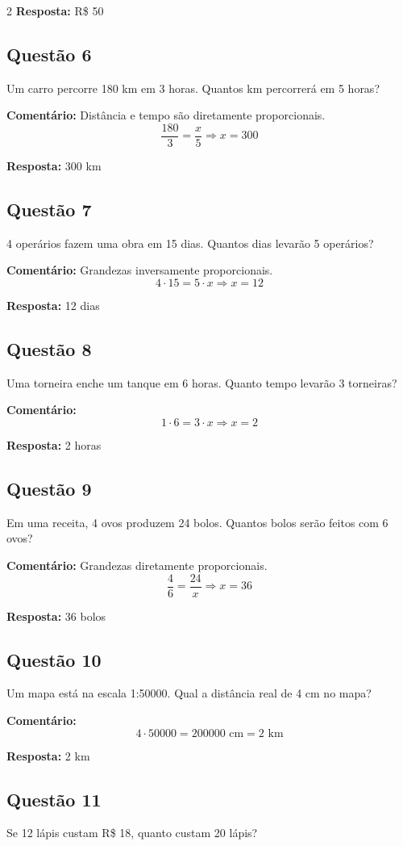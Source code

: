 \documentclass[11pt]{article}
\begin{document}
\begin{multicols}{2}
\textbf{Resposta:} R\$ 50

\subsection*{Questão 6}
Um carro percorre 180 km em 3 horas. Quantos km percorrerá em 5 horas?

\textbf{Comentário:} Distância e tempo são diretamente proporcionais.
\[
\frac{180}{3} = \frac{x}{5} \Rightarrow x = 300
\]

\textbf{Resposta:} 300 km

\subsection*{Questão 7}
4 operários fazem uma obra em 15 dias. Quantos dias levarão 5 operários?

\textbf{Comentário:} Grandezas inversamente proporcionais.
\[
4 \cdot 15 = 5 \cdot x \Rightarrow x = 12
\]

\textbf{Resposta:} 12 dias

\subsection*{Questão 8}
Uma torneira enche um tanque em 6 horas. Quanto tempo levarão 3 torneiras?

\textbf{Comentário:}
\[
1 \cdot 6 = 3 \cdot x \Rightarrow x = 2
\]

\textbf{Resposta:} 2 horas

\subsection*{Questão 9}
Em uma receita, 4 ovos produzem 24 bolos. Quantos bolos serão feitos com 6 ovos?

\textbf{Comentário:} Grandezas diretamente proporcionais.
\[
\frac{4}{6} = \frac{24}{x} \Rightarrow x = 36
\]

\textbf{Resposta:} 36 bolos

\subsection*{Questão 10}
Um mapa está na escala 1:50000. Qual a distância real de 4 cm no mapa?

\textbf{Comentário:}
\[
4 \cdot 50000 = 200000 \text{ cm} = 2 \text{ km}
\]

\textbf{Resposta:} 2 km

\subsection*{Questão 11}
Se 12 lápis custam R\$ 18, quanto custam 20 lápis?


\end{multicols}
\end{document}
